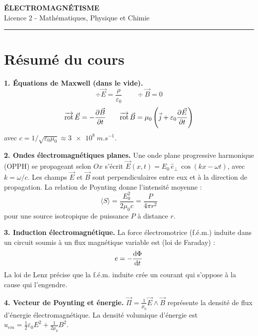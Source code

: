 \documentclass[12pt,a4paper]{article}
\begin{document}
\fi

\begin{center}
  {\LARGE\bfseries ÉLECTROMAGNÉTISME}\\[0.3cm]
  {\normalsize Licence 2 - Mathématiques, Physique et Chimie}\\[0.1cm]
  \rule{0.7\textwidth}{0.8pt}
\end{center}

\vspace{0.3cm}

\section*{Résumé du cours}

\begin{boiteresume}

\textbf{1. Équations de Maxwell (dans le vide).}
\[
\div\vec{E} = \frac{\rho}{\varepsilon_0} \qquad \div\vec{B} = 0
\]
\[
\overrightarrow{\mathrm{rot}}\,\vec{E} = -\dfrac{\partial \vec{B}}{\partial t} \qquad \overrightarrow{\mathrm{rot}}\,\vec{B} = \mu_0\left(\vec{j} + \varepsilon_0\dfrac{\partial \vec{E}}{\partial t}\right)
\]
avec $c = 1/\sqrt{\varepsilon_0\mu_0} \approx \qty{3e8}{m.s^{-1}}$.

\textbf{2. Ondes électromagnétiques planes.} Une onde plane progressive harmonique (OPPH) se propageant selon $Ox$ s'écrit $\vec{E}(x,t) = E_0\,\hat{e}_\perp\,\cos(kx - \omega t)$, avec $k = \omega/c$. Les champs $\vec{E}$ et $\vec{B}$ sont perpendiculaires entre eux et à la direction de propagation. La relation de Poynting donne l'intensité moyenne :
\[
\langle S \rangle = \frac{E_{0}^2}{2\mu_0 c} = \frac{P}{4\pi r^2}
\]
pour une source isotropique de puissance $P$ à distance $r$.

\textbf{3. Induction électromagnétique.} La force électromotrice (f.é.m.) induite dans un circuit soumis à un flux magnétique variable est (loi de Faraday) :
\[
e = -\dfrac{\mathrm{d} \Phi}{\mathrm{d} t}
\]
La loi de Lenz précise que la f.é.m. induite crée un courant qui s'oppose à la cause qui l'engendre.

\textbf{4. Vecteur de Poynting et énergie.} $\vec{\Pi} = \frac{1}{\mu_0}\vec{E}\wedge\vec{B}$ représente la densité de flux d'énergie électromagnétique. La densité volumique d'énergie est $u_{em} = \frac{1}{2}\varepsilon_0 E^2 + \frac{1}{2\mu_0}B^2$.

\end{boiteresume}

\newpage
\end{document}
